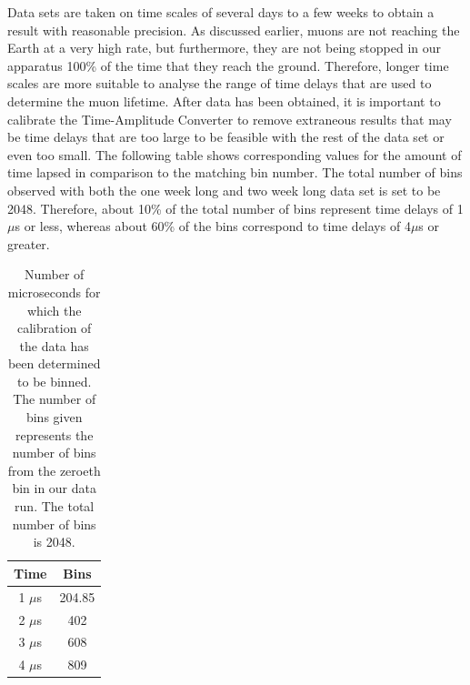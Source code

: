 Data sets are taken on time scales of several days to a few weeks to obtain a result with reasonable precision. As discussed earlier, muons are not reaching the Earth at a very high rate, but furthermore, they are not being stopped in our apparatus 100\% of the time that they reach the ground. Therefore, longer time scales are more suitable to analyse the range of time delays that are used to determine the muon lifetime. After data has been obtained, it is important to calibrate the Time-Amplitude Converter to remove extraneous results that may be time delays that are too large to be feasible with the rest of the data set or even too small. The following table shows corresponding values for the amount of time lapsed in comparison to the matching bin number. The total number of bins observed with both the one week long and two week long data set is set to be 2048. Therefore, about 10\% of the total number of bins represent time delays of 1$\mu$s or less, whereas about 60\% of the bins correspond to time delays of 4$\mu$s or greater. 
\begin{table}[h]
\begin{center}
\begin{tabular}{|c|c|}\hline
Time & Bins\\ \hline
1 $\mu$s & 204.85\\ \hline
2 $\mu$s & 402 \\ \hline
3 $\mu$s & 608 \\ \hline
4 $\mu$s & 809 \\ \hline
\end{tabular}
\caption{Number of microseconds for which the calibration of the data has been determined to be binned. The number of bins given represents the number of bins from the zeroeth bin in our data run. The total number of bins  is 2048.}
\end{center}
\end{table}



